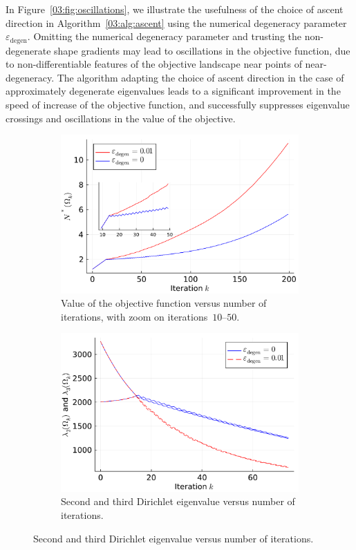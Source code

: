In Figure~\ref{03:fig:oscillations}, we illustrate the usefulness of the choice of ascent direction in Algorithm~\ref{03:alg:ascent} using the numerical degeneracy parameter~$\varepsilon_{\mathrm{degen}}$. Omitting the numerical degeneracy parameter and trusting the non-degenerate shape gradients may lead to oscillations in the objective function, due to non-differentiable features of the objective landscape near points of near-degeneracy. The algorithm adapting the choice of ascent direction in the case of approximately degenerate eigenvalues leads to a significant improvement in the speed of increase of the objective function, and successfully suppresses eigenvalue crossings and oscillations in the value of the objective.
\begin{figure}
    \begin{subfigure}{0.49\linewidth}
        \center
            \includegraphics[width=\linewidth]{figures/03/shape_optim_diala/algo/obj_mix.pdf}
            \caption[]{Value of the objective function versus number of iterations, with zoom on iterations~$10$--$50$.}
            \label{03:fig:obj_mix}
        \end{subfigure}
        \begin{subfigure}{0.49\linewidth}
        \center
            \includegraphics[width=\linewidth]{figures/03/shape_optim_diala/algo/lambdas_mix.pdf}
            \caption[]{Second and third Dirichlet eigenvalue versus number of iterations.}
            \label{03:fig:oscillations_mix}
        \end{subfigure}


\end{figure}
